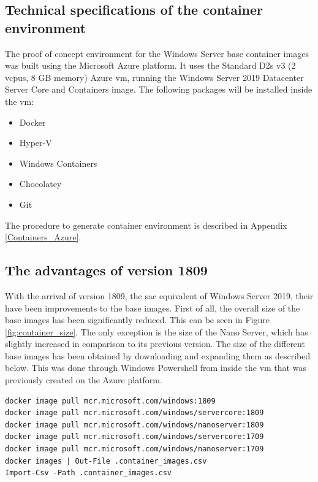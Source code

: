 \subsection{Technical specifications of the container environment}
The proof of concept environment for the Windows Server base container images was built using the Microsoft Azure platform. It uses the Standard D2s v3 (2 vcpus, 8 GB memory) Azure \acrshort{vm}, running the Windows Server 2019 Datacenter Server Core and Containers image.
The following packages will be installed inside the \acrshort{vm}:
\begin{itemize}
	\item Docker
	\item Hyper-V
	\item Windows Containers
	\item Chocolatey
	\item Git
\end{itemize}
The procedure to generate container environment is described in Appendix \ref{Containers_Azure}.

\subsection{The advantages of version 1809}
With the arrival of version 1809, the \acrfull{sac} equivalent of Windows Server 2019, their have been improvements to the base images. First of all, the overall size of the base images has been significantly reduced. This can be seen in Figure \ref{fig:container_size}. The only exception is the size of the Nano Server, which has slightly increased in comparison to its previous version. 
The size of the different base images has been obtained by downloading and expanding them as described below. This was done through Windows Powershell from inside the \acrshort{vm} that was previously created on the Azure platform. 

\begin{lstlisting}[breaklines]
docker image pull mcr.microsoft.com/windows:1809
docker image pull mcr.microsoft.com/windows/servercore:1809
docker image pull mcr.microsoft.com/windows/nanoserver:1809  
docker image pull mcr.microsoft.com/windows/servercore:1709 
docker image pull mcr.microsoft.com/windows/nanoserver:1709   
docker images | Out-File .container_images.csv
Import-Csv -Path .container_images.csv
\end{lstlisting}

